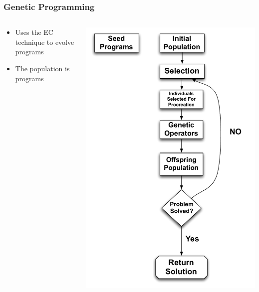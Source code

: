 \documentclass{beamer}
\begin{document}
\begin{frame}
	\frametitle{Genetic Programming}
\begin{columns}
\begin{column}{0.5\textwidth}
\begin{itemize}	
	\item Uses the EC technique to evolve programs
	\item The population is programs
	
\end{itemize}
\end{column}
\begin{column}{0.5\textwidth}
   \includegraphics[height=0.90\textheight]{Illustrations/GP1.pdf}
       \\
\end{column}
\end{columns}

\end{frame}
\end{document}
